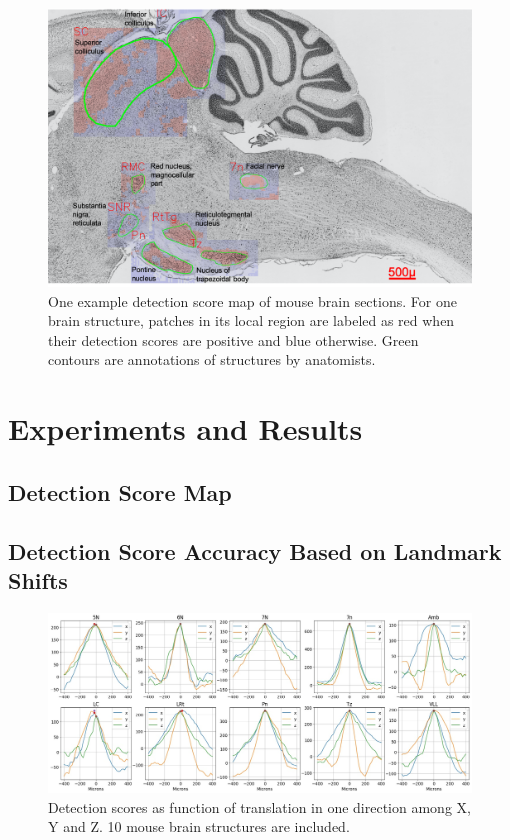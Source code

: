 \documentclass[runningheads]{llncs}
\begin{document}
\begin{figure}
\includegraphics[width=\textwidth]{256.png}
\caption{One example detection score map of mouse brain sections. For one brain structure, patches in its local region are labeled as red when their detection scores are positive and blue otherwise. Green contours are annotations of structures by anatomists.}
\label{scoremap}
\end{figure}

\section{Experiments and Results}


\subsection{Detection Score Map}

\subsection{Detection Score Accuracy Based on Landmark Shifts}



\begin{figure}
\includegraphics[width=\textwidth]{shift1.jpg}
\caption{Detection scores as function of translation in one direction among X, Y and Z. 10 mouse brain structures are included.}
\label{1Dshift}
\end{figure}
\end{document}
